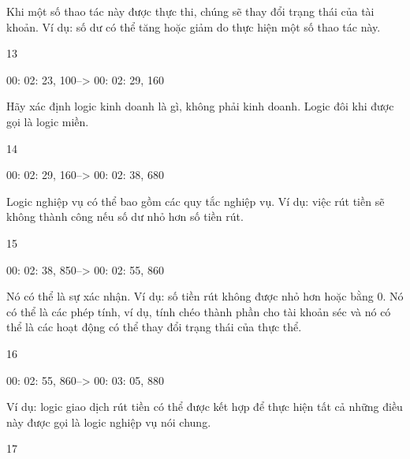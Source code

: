 
\begin{example}

\end{example}






Khi một số thao tác này được thực thi, chúng sẽ thay đổi trạng thái của tài khoản. Ví dụ: số dư có thể tăng hoặc giảm do thực hiện một số thao tác này.

13

00: 02: 23, 100--> 00: 02: 29, 160

Hãy xác định logic kinh doanh là gì, không phải kinh doanh. Logic đôi khi được gọi là logic miền.

14

00: 02: 29, 160--> 00: 02: 38, 680

Logic nghiệp vụ có thể bao gồm các quy tắc nghiệp vụ. Ví dụ: việc rút tiền sẽ không thành công nếu số dư nhỏ hơn số tiền rút.

15

00: 02: 38, 850--> 00: 02: 55, 860

Nó có thể là sự xác nhận. Ví dụ: số tiền rút không được nhỏ hơn hoặc bằng 0. Nó có thể là các phép tính, ví dụ, tính chéo thành phần cho tài khoản séc và nó có thể là các hoạt động có thể thay đổi trạng thái của thực thể.

16

00: 02: 55, 860--> 00: 03: 05, 880

Ví dụ: logic giao dịch rút tiền có thể được kết hợp để thực hiện tất cả những điều này được gọi là logic nghiệp vụ nói chung.

17


